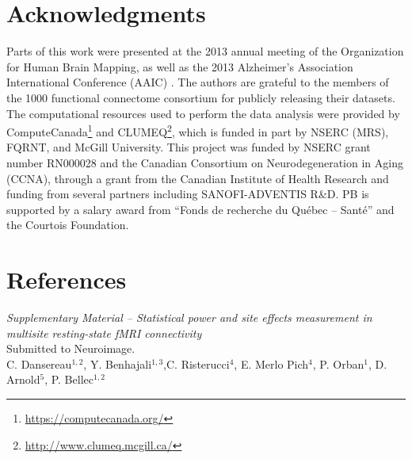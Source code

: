 \documentclass[authoryear]{elsarticle}
\begin{document}
\section{Acknowledgments}
Parts of this work were presented at the 2013 annual meeting of the Organization for Human Brain Mapping, as well as the 2013 Alzheimer's Association International Conference (AAIC) \citep{Dansereau2013b}. The authors are grateful to the members of the 1000 functional connectome consortium for publicly releasing their datasets. The computational resources used to perform the data analysis were provided by ComputeCanada\footnote{\url{https://computecanada.org/}} and CLUMEQ\footnote{\url{http://www.clumeq.mcgill.ca/}}, which is funded in part by NSERC (MRS), FQRNT, and McGill University. This project was funded by NSERC grant number RN000028 and the Canadian
Consortium on Neurodegeneration in Aging (CCNA), through a grant from
the Canadian Institute of Health Research and funding from several partners including SANOFI-ADVENTIS R\&D. PB is supported by a salary award from ``Fonds de recherche du Qu\'ebec -- Sant\'e'' and the Courtois Foundation.

\section*{References}





\pagebreak



\clearpage
\appendix


\clearpage
\pagebreak
\renewcommand{\thefigure}{S\arabic{figure}}
\renewcommand{\thetable}{S\arabic{table}}
\setcounter{figure}{0}
\begin{center}
\emph{Supplementary Material {--} Statistical power and site effects measurement in multisite resting-state fMRI connectivity}\\

\vspace{\baselineskip}Submitted to Neuroimage.\\

\vspace{\baselineskip}C. Dansereau$^{1,2}$,  Y. Benhajali$^{1,3}$,C. Risterucci$^{4}$, E. Merlo Pich$^{4}$, P. Orban$^{1}$, D. Arnold$^{5}$, P. Bellec$^{1,2}$\\

\end{center}
\end{document}
